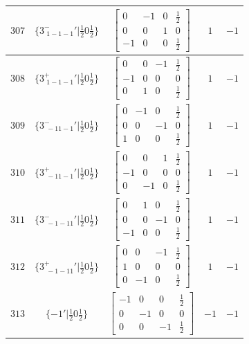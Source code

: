 \documentclass[fleqn,8pt]{jsarticle}
\begin{document}
\begin{longtable}{ccccc}
$ 307 $ & $ \{3^{-}_{\,\,1-1-1}{}'|\frac{1}{2} 0 \frac{1}{2}\} $ & $ \begin{bmatrix} 0 & -1 & 0 & \frac{1}{2} \\ 0 & 0 & 1 & 0 \\ -1 & 0 & 0 & \frac{1}{2} \end{bmatrix} $ & $ 1 $ & $ -1 $ \\ \hline
$ 308 $ & $ \{3^{+}_{\,\,1-1-1}{}'|\frac{1}{2} 0 \frac{1}{2}\} $ & $ \begin{bmatrix} 0 & 0 & -1 & \frac{1}{2} \\ -1 & 0 & 0 & 0 \\ 0 & 1 & 0 & \frac{1}{2} \end{bmatrix} $ & $ 1 $ & $ -1 $ \\ \hline
$ 309 $ & $ \{3^{-}_{\,\,-11-1}{}'|\frac{1}{2} 0 \frac{1}{2}\} $ & $ \begin{bmatrix} 0 & -1 & 0 & \frac{1}{2} \\ 0 & 0 & -1 & 0 \\ 1 & 0 & 0 & \frac{1}{2} \end{bmatrix} $ & $ 1 $ & $ -1 $ \\ \hline
$ 310 $ & $ \{3^{+}_{\,\,-11-1}{}'|\frac{1}{2} 0 \frac{1}{2}\} $ & $ \begin{bmatrix} 0 & 0 & 1 & \frac{1}{2} \\ -1 & 0 & 0 & 0 \\ 0 & -1 & 0 & \frac{1}{2} \end{bmatrix} $ & $ 1 $ & $ -1 $ \\ \hline
$ 311 $ & $ \{3^{-}_{\,\,-1-11}{}'|\frac{1}{2} 0 \frac{1}{2}\} $ & $ \begin{bmatrix} 0 & 1 & 0 & \frac{1}{2} \\ 0 & 0 & -1 & 0 \\ -1 & 0 & 0 & \frac{1}{2} \end{bmatrix} $ & $ 1 $ & $ -1 $ \\ \hline
$ 312 $ & $ \{3^{+}_{\,\,-1-11}{}'|\frac{1}{2} 0 \frac{1}{2}\} $ & $ \begin{bmatrix} 0 & 0 & -1 & \frac{1}{2} \\ 1 & 0 & 0 & 0 \\ 0 & -1 & 0 & \frac{1}{2} \end{bmatrix} $ & $ 1 $ & $ -1 $ \\ \hline
$ 313 $ & $ \{-1{}'|\frac{1}{2} 0 \frac{1}{2}\} $ & $ \begin{bmatrix} -1 & 0 & 0 & \frac{1}{2} \\ 0 & -1 & 0 & 0 \\ 0 & 0 & -1 & \frac{1}{2} \end{bmatrix} $ & $ -1 $ & $ -1 $ \\ \hline

\end{longtable}
\end{document}
